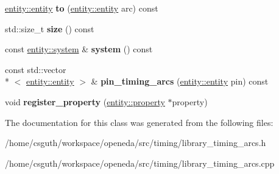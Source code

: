 \begin{DoxyCompactItemize}
\item 
\hypertarget{classophidian_1_1timing_1_1library__timing__arcs_adf5bcd7946f381e7b0b437e296379295}{\hyperlink{classophidian_1_1entity_1_1entity}{entity\-::entity} {\bfseries to} (\hyperlink{classophidian_1_1entity_1_1entity}{entity\-::entity} arc) const }\label{classophidian_1_1timing_1_1library__timing__arcs_adf5bcd7946f381e7b0b437e296379295}

\item 
\hypertarget{classophidian_1_1timing_1_1library__timing__arcs_a32593c010255c8a6c731119eafd8e1ad}{std\-::size\-\_\-t {\bfseries size} () const }\label{classophidian_1_1timing_1_1library__timing__arcs_a32593c010255c8a6c731119eafd8e1ad}

\item 
\hypertarget{classophidian_1_1timing_1_1library__timing__arcs_afb8f1a8a4d4b6e84a7402e9a0b22569a}{const \hyperlink{classophidian_1_1entity_1_1system}{entity\-::system} \& {\bfseries system} () const }\label{classophidian_1_1timing_1_1library__timing__arcs_afb8f1a8a4d4b6e84a7402e9a0b22569a}

\item 
\hypertarget{classophidian_1_1timing_1_1library__timing__arcs_a067232d44b79e2fd03e236f3dcdfedf8}{const std\-::vector\\*
$<$ \hyperlink{classophidian_1_1entity_1_1entity}{entity\-::entity} $>$ \& {\bfseries pin\-\_\-timing\-\_\-arcs} (\hyperlink{classophidian_1_1entity_1_1entity}{entity\-::entity} pin) const }\label{classophidian_1_1timing_1_1library__timing__arcs_a067232d44b79e2fd03e236f3dcdfedf8}

\item 
\hypertarget{classophidian_1_1timing_1_1library__timing__arcs_a8d5d9530864dacf0c2b4a0a43332574f}{void {\bfseries register\-\_\-property} (\hyperlink{classophidian_1_1entity_1_1property}{entity\-::property} $\ast$property)}\label{classophidian_1_1timing_1_1library__timing__arcs_a8d5d9530864dacf0c2b4a0a43332574f}

\end{DoxyCompactItemize}


The documentation for this class was generated from the following files\-:\begin{DoxyCompactItemize}
\item 
/home/csguth/workspace/openeda/src/timing/library\-\_\-timing\-\_\-arcs.\-h\item 
/home/csguth/workspace/openeda/src/timing/library\-\_\-timing\-\_\-arcs.\-cpp\end{DoxyCompactItemize}
